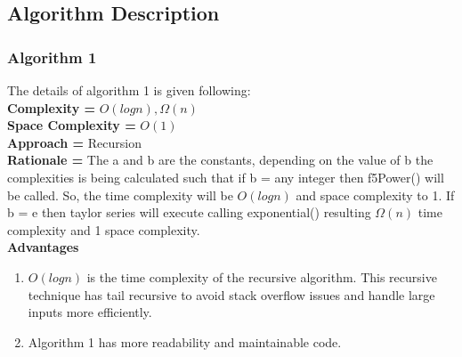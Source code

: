 \documentclass[a4paper,12pt]{article}
\begin{document}
    \subsection{Algorithm Description}
        \subsubsection{Algorithm 1}
    The details of algorithm 1 is given following:
    \\\textbf{ Complexity = } $O(logn), \Omega(n)$
    \\\textbf{Space Complexity = } $O(1)$
    \\\textbf{Approach = } Recursion
    \\\textbf{Rationale = } The a and b are the constants, depending on the value of b the complexities is being calculated such that if b = any integer then f5Power() will be called. So, the time complexity will be $O(logn)$ and space complexity to 1. If b = e then taylor series will execute calling exponential() resulting $\Omega(n)$ time complexity and 1 space complexity.
    \\\textbf{Advantages}
    \begin{enumerate}
        \item $O (log n)$ is the time complexity of the recursive algorithm. This recursive technique has tail recursive to avoid stack overflow issues and handle large inputs more efficiently.
        \item Algorithm 1 has more readability and maintainable code.
    \end{enumerate}
    
\end{document}
